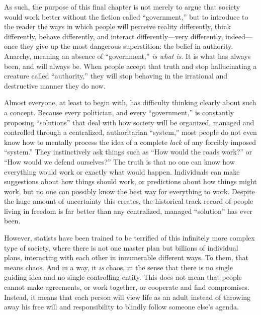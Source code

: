 \documentclass{book}
\begin{document}
As such, the purpose of this final chapter is not merely to argue that society would work better without the fiction called \enquote{government,} but to introduce to the reader the ways in which people will perceive reality differently, think differently, behave differently, and interact differently---very differently, indeed---once they give up the most dangerous superstition: the belief in authority. Anarchy, meaning an absence of \enquote{government,} \emph{is what is}. It is what has always been, and will always be. When people accept that truth and stop hallucinating a creature called \enquote{authority,} they will stop behaving in the irrational and destructive manner they do now.

Almost everyone, at least to begin with, has difficulty thinking clearly about such a concept. Because every politician, and every \enquote{government,} is constantly proposing \enquote{solutions} that deal with how society will be organized, managed and controlled through a centralized, authoritarian \enquote{system,} most people do not even know how to mentally process the idea of a complete \emph{lack} of any forcibly imposed \enquote{system.} They instinctively ask things such as \enquote{How would the roads work?} or \enquote{How would we defend ourselves?} The truth is that no one can know how everything would work or exactly what would happen. Individuals can make suggestions about how things should work, or predictions about how things might work, but no one can possibly know the best way for everything to work. Despite the huge amount of uncertainty this creates, the historical track record of people living in freedom is far better than any centralized, managed \enquote{solution} has ever been.

However, statists have been trained to be terrified of this infinitely more complex type of society, where there is not one master plan but billions of individual plans, interacting with each other in innumerable different ways. To them, that means chaos. And in a way, it \emph{is} chaos, in the sense that there is no single guiding idea and no single controlling entity. This does not mean that people cannot make agreements, or work together, or cooperate and find compromises. Instead, it means that each person will view life as an adult instead of throwing away his free will and responsibility to blindly follow someone else's agenda.
\end{document}
